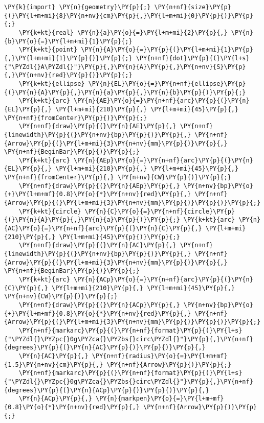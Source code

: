 \begin{Verbatim}[commandchars=\\\{\}]
    \PY{k}{import} \PY{n}{geometry}\PY{p}{;} \PY{n+nf}{size}\PY{p}{(}\PY{l+m+mi}{8}\PY{n+nv}{cm}\PY{p}{,}\PY{l+m+mi}{0}\PY{p}{)}\PY{p}{;}
    \PY{k+kt}{real} \PY{n}{a}\PY{o}{=}\PY{l+m+mi}{2}\PY{p}{,} \PY{n}{b}\PY{o}{=}\PY{l+m+mi}{1}\PY{p}{;}
    \PY{k+kt}{point} \PY{n}{A}\PY{o}{=}\PY{p}{(}\PY{l+m+mi}{1}\PY{p}{,}\PY{l+m+mi}{1}\PY{p}{)}\PY{p}{;} \PY{n+nf}{dot}\PY{p}{(}\PY{l+s}{"\PYZdl{}A\PYZdl{}"}\PY{p}{,}\PY{n}{A}\PY{p}{,}\PY{n+nv}{S}\PY{p}{,}\PY{n+nv}{red}\PY{p}{)}\PY{p}{;}
    \PY{k+kt}{ellipse} \PY{n}{EL}\PY{o}{=}\PY{n+nf}{ellipse}\PY{p}{(}\PY{n}{A}\PY{p}{,}\PY{n}{a}\PY{p}{,}\PY{n}{b}\PY{p}{)}\PY{p}{;}
    \PY{k+kt}{arc} \PY{n}{AE}\PY{o}{=}\PY{n+nf}{arc}\PY{p}{(}\PY{n}{EL}\PY{p}{,} \PY{l+m+mi}{210}\PY{p}{,} \PY{l+m+mi}{45}\PY{p}{,} \PY{n+nf}{fromCenter}\PY{p}{)}\PY{p}{;}
    \PY{n+nf}{draw}\PY{p}{(}\PY{n}{AE}\PY{p}{,} \PY{n+nf}{linewidth}\PY{p}{(}\PY{n+nv}{bp}\PY{p}{)}\PY{p}{,} \PY{n+nf}{Arrow}\PY{p}{(}\PY{l+m+mi}{3}\PY{n+nv}{mm}\PY{p}{)}\PY{p}{,} \PY{n+nf}{BeginBar}\PY{p}{)}\PY{p}{;}
    \PY{k+kt}{arc} \PY{n}{AEp}\PY{o}{=}\PY{n+nf}{arc}\PY{p}{(}\PY{n}{EL}\PY{p}{,} \PY{l+m+mi}{210}\PY{p}{,} \PY{l+m+mi}{45}\PY{p}{,} \PY{n+nf}{fromCenter}\PY{p}{,} \PY{n+nv}{CW}\PY{p}{)}\PY{p}{;}
    \PY{n+nf}{draw}\PY{p}{(}\PY{n}{AEp}\PY{p}{,} \PY{n+nv}{bp}\PY{o}{+}\PY{l+m+mf}{0.8}\PY{o}{*}\PY{n+nv}{red}\PY{p}{,} \PY{n+nf}{Arrow}\PY{p}{(}\PY{l+m+mi}{3}\PY{n+nv}{mm}\PY{p}{)}\PY{p}{)}\PY{p}{;}
    \PY{k+kt}{circle} \PY{n}{C}\PY{o}{=}\PY{n+nf}{circle}\PY{p}{(}\PY{n}{A}\PY{p}{,}\PY{n}{a}\PY{p}{)}\PY{p}{;} \PY{k+kt}{arc} \PY{n}{AC}\PY{o}{=}\PY{n+nf}{arc}\PY{p}{(}\PY{n}{C}\PY{p}{,} \PY{l+m+mi}{210}\PY{p}{,} \PY{l+m+mi}{45}\PY{p}{)}\PY{p}{;}
    \PY{n+nf}{draw}\PY{p}{(}\PY{n}{AC}\PY{p}{,} \PY{n+nf}{linewidth}\PY{p}{(}\PY{n+nv}{bp}\PY{p}{)}\PY{p}{,} \PY{n+nf}{Arrow}\PY{p}{(}\PY{l+m+mi}{3}\PY{n+nv}{mm}\PY{p}{)}\PY{p}{,} \PY{n+nf}{BeginBar}\PY{p}{)}\PY{p}{;}
    \PY{k+kt}{arc} \PY{n}{ACp}\PY{o}{=}\PY{n+nf}{arc}\PY{p}{(}\PY{n}{C}\PY{p}{,} \PY{l+m+mi}{210}\PY{p}{,} \PY{l+m+mi}{45}\PY{p}{,} \PY{n+nv}{CW}\PY{p}{)}\PY{p}{;}
    \PY{n+nf}{draw}\PY{p}{(}\PY{n}{ACp}\PY{p}{,} \PY{n+nv}{bp}\PY{o}{+}\PY{l+m+mf}{0.8}\PY{o}{*}\PY{n+nv}{red}\PY{p}{,} \PY{n+nf}{Arrow}\PY{p}{(}\PY{l+m+mi}{3}\PY{n+nv}{mm}\PY{p}{)}\PY{p}{)}\PY{p}{;}
    \PY{n+nf}{markarc}\PY{p}{(}\PY{n+nf}{format}\PY{p}{(}\PY{l+s}{"\PYZdl{}\PYZpc{}0g\PYZca{}\PYZbs{}circ\PYZdl{}"}\PY{p}{,}\PY{n+nf}{degrees}\PY{p}{(}\PY{n}{AC}\PY{p}{)}\PY{p}{)}\PY{p}{,}
    \PY{n}{AC}\PY{p}{,} \PY{n+nf}{radius}\PY{o}{=}\PY{l+m+mf}{1.5}\PY{n+nv}{cm}\PY{p}{,} \PY{n+nf}{Arrow}\PY{p}{)}\PY{p}{;}
    \PY{n+nf}{markarc}\PY{p}{(}\PY{n+nf}{format}\PY{p}{(}\PY{l+s}{"\PYZdl{}\PYZpc{}0g\PYZca{}\PYZbs{}circ\PYZdl{}"}\PY{p}{,}\PY{n+nf}{degrees}\PY{p}{(}\PY{n}{ACp}\PY{p}{)}\PY{p}{)}\PY{p}{,}
    \PY{n}{ACp}\PY{p}{,} \PY{n}{markpen}\PY{o}{=}\PY{l+m+mf}{0.8}\PY{o}{*}\PY{n+nv}{red}\PY{p}{,} \PY{n+nf}{Arrow}\PY{p}{)}\PY{p}{;}
\end{Verbatim}

